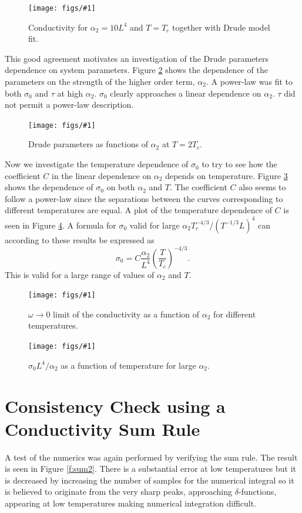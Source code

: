 \documentclass[12pt]{report}
\newcommand{\fig}[2]{
\begin{figure}
\centering
\texttt{[image: figs/\#1]}
\caption{#2}
\end{figure}
}
\begin{document}
\fig{drude_T_1Tc_a2_10}{Conductivity for $\alpha_2=10L^4$ and $T=T_c$ together with Drude model fit.\label{f:drude2}}

This good agreement motivates an investigation of the Drude parameters dependence on system parameters. Figure \ref{f:drudeVar} shows the dependence of the parameters on the strength of the higher order term, $\alpha_2$. A power-law was fit to both $\sigma_0$ and $\tau$ at high $\alpha_2$. $\sigma_0$ clearly approaches a linear dependence on $\alpha_2$. $\tau$ did not permit a power-law description.\\
\fig{drudeVara2_T=2Tc}{Drude parameters as functions of $\alpha_2$ at $T=2T_c$.\label{f:drudeVar}}

Now we investigate the temperature dependence of $\sigma_0$ to try to see how the coefficient $C$ in the linear dependence on $\alpha_2$ depends on temperature. Figure \ref{f:drudeVarT} shows the dependence of $\sigma_0$ on both $\alpha_2$ and $T$. The coefficient $C$ also seems to follow a power-law since the separations between the curves corresponding to different temperatures are equal. A plot of the temperature dependence of $C$ is seen in Figure \ref{f:Cdep}. A formula for $\sigma_0$ valid for large $\alpha_2T_c^{-4/3}/(T^{-1/3}L)^4$ can according to these results be expressed as
\begin{equation}
 \sigma_0=C\frac{\alpha_2}{L^4}\left(\frac{T}{T_c}\right)^{-4/3}.
\end{equation}
This is valid for a large range of values of $\alpha_2$ and $T$.

\fig{drudeVarMT}{$\omega\rightarrow0$ limit of the conductivity as a function of $\alpha_2$ for different temperatures.\label{f:drudeVarT}}

\fig{drudeTdep_1e4}{$\sigma_0L^4/\alpha_2$ as a function of temperature for large $\alpha_2$.\label{f:Cdep}}

\section{Consistency Check using a Conductivity Sum Rule}
A test of the numerics was again performed by verifying the sum rule. The result is seen in Figure \ref{f:sum2}.  There is a substantial error at low temperatures but it is decreased by increasing the number of samples for the numerical integral so it is believed to originate from the very sharp peaks, approaching $\delta$-functions, appearing at low temperatures making numerical integration difficult.
\end{document}
